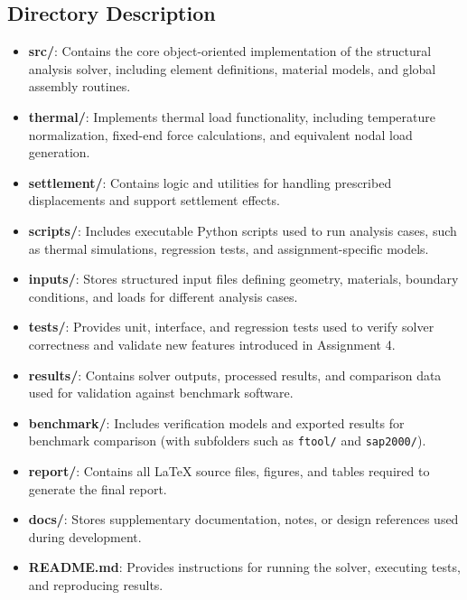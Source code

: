 \subsection{Directory Description}

\begin{itemize}
    \item \textbf{src/}: Contains the core object-oriented implementation of the
    structural analysis solver, including element definitions, material models,
    and global assembly routines.

    \item \textbf{thermal/}: Implements thermal load functionality, including
    temperature normalization, fixed-end force calculations, and equivalent
    nodal load generation.

    \item \textbf{settlement/}: Contains logic and utilities for handling
    prescribed displacements and support settlement effects.

    \item \textbf{scripts/}: Includes executable Python scripts used to run
    analysis cases, such as thermal simulations, regression tests, and
    assignment-specific models.

    \item \textbf{inputs/}: Stores structured input files defining geometry,
    materials, boundary conditions, and loads for different analysis cases.

    \item \textbf{tests/}: Provides unit, interface, and regression tests used
    to verify solver correctness and validate new features introduced in
    Assignment 4.

    \item \textbf{results/}: Contains solver outputs, processed results, and
    comparison data used for validation against benchmark software.

    \item \textbf{benchmark/}: Includes verification models and exported results
    for benchmark comparison (with subfolders such as \texttt{ftool/} and
    \texttt{sap2000/}).

    \item \textbf{report/}: Contains all LaTeX source files, figures, and tables
    required to generate the final report.

    \item \textbf{docs/}: Stores supplementary documentation, notes, or design
    references used during development.

    \item \textbf{README.md}: Provides instructions for running the solver,
    executing tests, and reproducing results.
\end{itemize}
